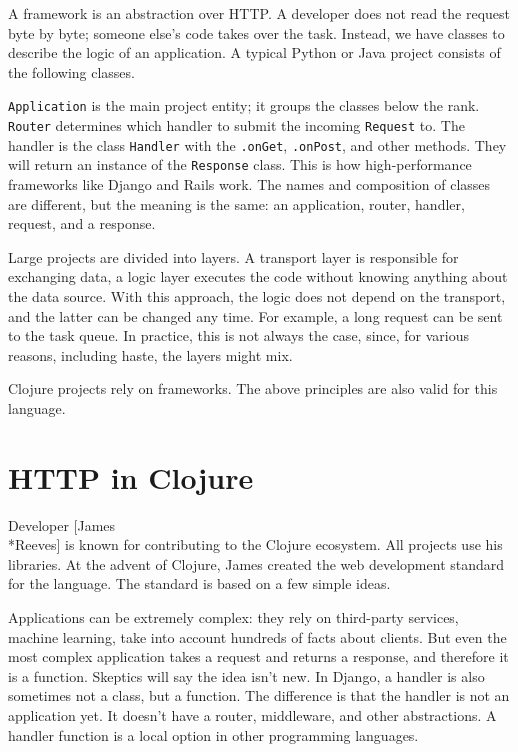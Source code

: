 
A framework is an abstraction over HTTP. A developer does not read the request byte by byte; someone else's code takes over the task. Instead, we have classes to describe the logic of an application. A typical Python or Java project consists of the following classes.

\verb|Application| is the main project entity; it groups the classes below the rank. \verb|Router| determines which handler to submit the incoming \verb|Request| to. The handler is the class \verb|Handler| with the \verb|.onGet|, \verb|.onPost|, and other methods. They will return an instance of the \verb|Response| class. This is how high-performance frameworks like Django and Rails work. The names and composition of classes are different, but the meaning is the same: an application, router, handler, request, and a response.


Large projects are divided into layers. A transport layer is responsible for exchanging data, a logic layer executes the code without knowing anything about the data source. With this approach, the logic does not depend on the transport, and the latter can be changed any time. For example, a long request can be sent to the task queue. In practice, this is not always the case, since, for various reasons, including haste, the layers might mix.

Clojure projects rely on frameworks. The above principles are also valid for this language.

\section{HTTP in Clojure}


Developer [James\\*Reeves] is known for contributing to the Clojure ecosystem.  All projects use his libraries.  At the advent of Clojure, James created the web development standard for the language. The standard is based on a few simple ideas.

Applications can be extremely complex: they rely on third-party services, machine learning, take into account hundreds of facts about clients. But even the most complex application takes a request and returns a response, and therefore it is a function. Skeptics will say the idea isn't new. In Django, a handler is also sometimes not a class, 
but a function. The difference is that the handler is not an application yet. It doesn't have a router, middleware, and other abstractions. A handler function is a local option in other programming languages.

